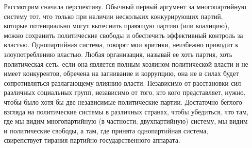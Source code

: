 \documentclass{book}
\begin{document}
Рассмотрим сначала перспективу. Обычный первый аргумент за многопартийную систему тот, что только при наличии не­скольких конкурирующих партий, которые потенциально мо­гут вытеснить правящую партию (или коалицию), можно со­хранить политические свободы и обеспечить эффективный контроль за властью. Однопартийная система, говорят мои кри­тики, неизбежно приводит к злоупотреблению властью. Любая организация, называй ее хоть партия, хоть политическая сеть, если она является полным хозяином политической власти и не имеет конкурентов, обречена на загнивание и коррупцию, она не в силах будет сопротивляться разлагающему влиянию власти. Независимо от расстановки сил различных социальных групп, независимо от того, кто кого представляет, нужно, что­бы было хотя бы две независимые политические партии. До­статочно беглого взгляда на политические системы в различных странах, чтобы убедиться, что там, где мы видим многопартий­ную (в частности, двухпартийную) систему, мы видим и поли­тические свободы, а там, где принята 
однопартийная система, свирепствует тирания партийно-государственного аппарата.
\end{document}
